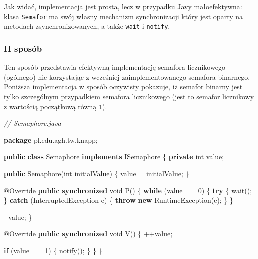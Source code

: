\documentclass[11pt]{article}
\newenvironment{Shaded}{}{}
\newcommand{\KeywordTok}[1]{\textcolor[rgb]{0.00,0.44,0.13}{\textbf{{#1}}}}
\newcommand{\DataTypeTok}[1]{\textcolor[rgb]{0.56,0.13,0.00}{{#1}}}
\newcommand{\DecValTok}[1]{\textcolor[rgb]{0.25,0.63,0.44}{{#1}}}
\newcommand{\CommentTok}[1]{\textcolor[rgb]{0.38,0.63,0.69}{\textit{{#1}}}}
\newcommand{\FunctionTok}[1]{\textcolor[rgb]{0.02,0.16,0.49}{{#1}}}
\newcommand{\NormalTok}[1]{{#1}}
\newcommand{\ImportTok}[1]{{#1}}
\newcommand{\ControlFlowTok}[1]{\textcolor[rgb]{0.00,0.44,0.13}{\textbf{{#1}}}}
\newcommand{\OperatorTok}[1]{\textcolor[rgb]{0.40,0.40,0.40}{{#1}}}
\newcommand{\BuiltInTok}[1]{{#1}}
\newcommand{\AttributeTok}[1]{\textcolor[rgb]{0.49,0.56,0.16}{{#1}}}
\begin{document}
Jak widać, implementacja jest prosta, lecz w przypadku Javy
małoefektywna: klasa \texttt{Semafor} ma swój własny mechanizm
synchronizacji który jest oparty na metodach zsynchronizowanych, a także
\texttt{wait} i \texttt{notify}.

    \hypertarget{ii-sposuxf3b}{%
\subsubsection{II sposób}\label{ii-sposuxf3b}}

Ten sposób przedstawia efektywną implementację semafora licznikowego
(ogólnego) nie korzystając z wcześniej zaimplementowanego semafora
binarnego. Poniższa implementacja w sposób oczywisty pokazuje, iż
semafor binarny jest tylko szczególnym przypadkiem semafora licznikowego
(jest to semafor licznikowy z wartością początkową równą \texttt{1}).

\begin{Shaded}
\begin{Highlighting}[]
\CommentTok{// Semaphore.java}

\KeywordTok{package}\ImportTok{ pl}\OperatorTok{.}\ImportTok{edu}\OperatorTok{.}\ImportTok{agh}\OperatorTok{.}\ImportTok{tw}\OperatorTok{.}\ImportTok{knapp}\OperatorTok{;}

\KeywordTok{public} \KeywordTok{class} \BuiltInTok{Semaphore} \KeywordTok{implements}\NormalTok{ ISemaphore }\OperatorTok{\{}
    \KeywordTok{private} \DataTypeTok{int}\NormalTok{ value}\OperatorTok{;}

    \KeywordTok{public} \BuiltInTok{Semaphore}\OperatorTok{(}\DataTypeTok{int}\NormalTok{ initialValue}\OperatorTok{)} \OperatorTok{\{}
\NormalTok{        value }\OperatorTok{=}\NormalTok{ initialValue}\OperatorTok{;}
    \OperatorTok{\}}

    \AttributeTok{@Override}
    \KeywordTok{public} \KeywordTok{synchronized} \DataTypeTok{void} \FunctionTok{P}\OperatorTok{()} \OperatorTok{\{}
        \ControlFlowTok{while} \OperatorTok{(}\NormalTok{value }\OperatorTok{==} \DecValTok{0}\OperatorTok{)} \OperatorTok{\{}
            \ControlFlowTok{try} \OperatorTok{\{}
                \FunctionTok{wait}\OperatorTok{();}
            \OperatorTok{\}} \ControlFlowTok{catch} \OperatorTok{(}\BuiltInTok{InterruptedException}\NormalTok{ e}\OperatorTok{)} \OperatorTok{\{}
                \ControlFlowTok{throw} \KeywordTok{new} \BuiltInTok{RuntimeException}\OperatorTok{(}\NormalTok{e}\OperatorTok{);}
            \OperatorTok{\}}
        \OperatorTok{\}}

        \OperatorTok{{-}{-}}\NormalTok{value}\OperatorTok{;}
    \OperatorTok{\}}

    \AttributeTok{@Override}
    \KeywordTok{public} \KeywordTok{synchronized} \DataTypeTok{void} \FunctionTok{V}\OperatorTok{()} \OperatorTok{\{}
        \OperatorTok{++}\NormalTok{value}\OperatorTok{;}

        \ControlFlowTok{if} \OperatorTok{(}\NormalTok{value }\OperatorTok{==} \DecValTok{1}\OperatorTok{)} \OperatorTok{\{}
            \FunctionTok{notify}\OperatorTok{();}
        \OperatorTok{\}}
    \OperatorTok{\}}
\OperatorTok{\}}
\end{Highlighting}
\end{Shaded}
\end{document}
